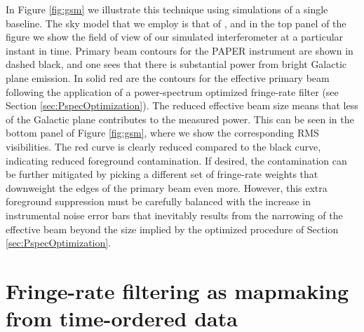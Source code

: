 \documentclass[twocolumn,apj,numberedappendix]{emulateapj}
\begin{document}
In Figure \ref{fig:gsm} we illustrate this technique using simulations of a single baseline. The sky model
that we employ is that of \citet{deoliveiracosta_et_al2008}, and in the top panel of the figure we show
the field of view of our simulated interferometer at a particular instant in time. Primary beam contours
for the PAPER instrument are shown in dashed black, and one sees that there is substantial power from
bright Galactic plane emission. In solid red are the contours for the effective primary beam following
the application of a power-spectrum optimized fringe-rate filter (see Section \ref{sec:PspecOptimization}).
The reduced effective beam size means that less of the Galactic plane contributes to the measured
power. This can be seen in the bottom panel of Figure \ref{fig:gsm}, where we show the corresponding
RMS visibilities. The red curve is clearly reduced compared to the black curve, indicating
reduced foreground contamination. If desired, the contamination can be further mitigated by picking
a different set of fringe-rate weights that downweight the edges of the primary beam even more. However,
this extra foreground suppression must be carefully balanced with the increase in instrumental noise error
bars that inevitably results from the narrowing of the effective beam beyond the size implied by the optimized procedure of
Section \ref{sec:PspecOptimization}.






\section{Fringe-rate filtering as mapmaking from time-ordered data}
\label{sec:Mapmaking}
\end{document}
